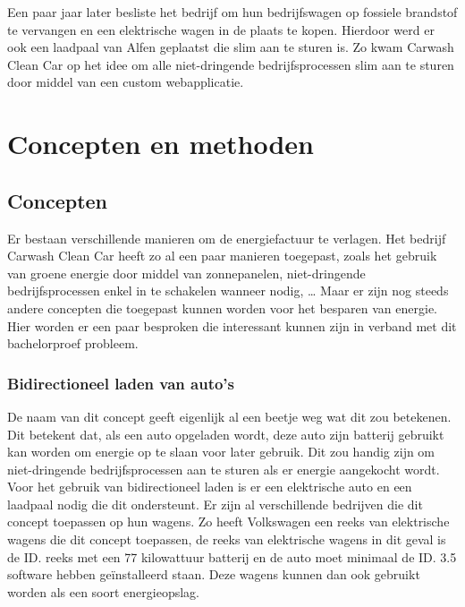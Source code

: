 \pagebreak

Een paar jaar later besliste het bedrijf om hun bedrijfswagen op fossiele brandstof te vervangen en een elektrische wagen in de plaats te kopen. Hierdoor werd er ook een laadpaal van Alfen geplaatst die slim aan te sturen is. Zo kwam Carwash Clean Car op het idee om alle niet-dringende bedrijfsprocessen slim aan te sturen door middel van een custom webapplicatie.

\section{Concepten en methoden}
\label{sec:stand-van-zaken-concepten-methoden}

\subsection{Concepten}
\label{sec:stand-van-zaken-concepten}

Er bestaan verschillende manieren om de energiefactuur te verlagen. Het bedrijf Carwash Clean Car heeft zo al een paar manieren toegepast, zoals het gebruik van groene energie door middel van zonnepanelen, niet-dringende bedrijfsprocessen enkel in te schakelen wanneer nodig, … Maar er zijn nog steeds andere concepten die toegepast kunnen worden voor het besparen van energie. Hier worden er een paar besproken die interessant kunnen zijn in verband met dit bachelorproef probleem.

\subsubsection{Bidirectioneel laden van auto's}
\label{sec:stand-van-zaken-bidirectioneel-laden}

De naam van dit concept geeft eigenlijk al een beetje weg wat dit zou betekenen. Dit betekent dat, als een auto opgeladen wordt, deze auto zijn batterij gebruikt kan worden om energie op te slaan voor later gebruik. Dit zou handig zijn om niet-dringende bedrijfsprocessen aan te sturen als er energie aangekocht wordt.\\

Voor het gebruik van bidirectioneel laden is er een elektrische auto en een laadpaal nodig die dit ondersteunt. Er zijn al verschillende bedrijven die dit concept toepassen op hun wagens. Zo heeft Volkswagen een reeks van elektrische wagens die dit concept toepassen, de reeks van elektrische wagens in dit geval is de ID. reeks met een 77 kilowattuur batterij en de auto moet minimaal de ID. 3.5 software hebben geïnstalleerd staan. Deze wagens kunnen dan ook gebruikt worden als een soort energieopslag.\\


